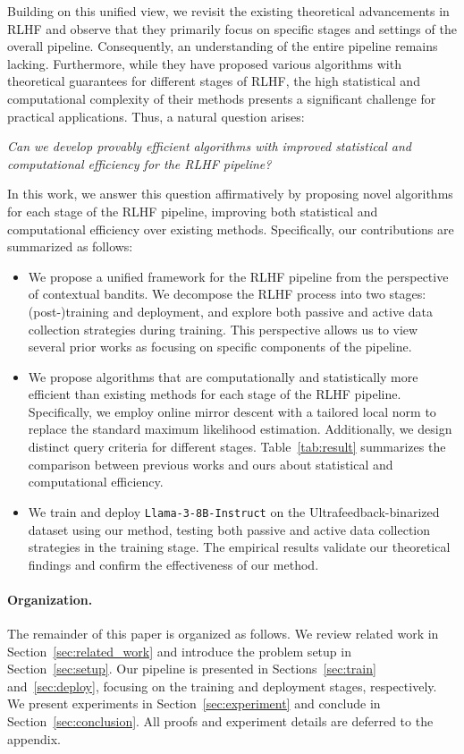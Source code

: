 Building on this unified view, we revisit the existing theoretical advancements in RLHF and observe that they primarily focus on specific stages and settings of the overall pipeline. Consequently, an understanding of the entire pipeline remains lacking. Furthermore, while they have proposed various algorithms with theoretical guarantees for different stages of RLHF, the high statistical and computational complexity of their methods presents a significant challenge for practical applications. Thus, a natural question arises:
\begin{center} 
    \textit{Can we develop provably efficient algorithms with improved statistical and computational efficiency for the RLHF pipeline?}
\end{center}
In this work, we answer this question affirmatively by proposing novel algorithms for each stage of the RLHF pipeline, improving both statistical and computational efficiency over existing methods. Specifically, our contributions are summarized as follows:
\begin{itemize}
    \item We propose a unified framework for the RLHF pipeline from the perspective of contextual bandits. We decompose the RLHF process into two stages: (post-)training and deployment, and explore both passive and active data collection strategies during training. This perspective allows us to view several prior works as focusing on specific components of the pipeline.
    \item We propose algorithms that are computationally and statistically more efficient than existing methods for each stage of the RLHF pipeline. Specifically, we employ online mirror descent with a tailored local norm to replace the standard maximum likelihood estimation. Additionally, we design distinct query criteria for different stages. Table~\ref{tab:result} summarizes the comparison between previous works and ours about statistical and computational efficiency.
    \item We train and deploy \texttt{Llama-3-8B-Instruct} on the \mbox{Ultrafeedback-binarized} dataset using our method, testing both passive and active data collection strategies in the training stage. The empirical results validate our theoretical findings and confirm the effectiveness of our method.
\end{itemize}

\paragraph{Organization.} The remainder of this paper is organized as follows. We review related work in Section~\ref{sec:related_work} and introduce the problem setup in Section~\ref{sec:setup}. Our pipeline is presented in Sections~\ref{sec:train} and~\ref{sec:deploy}, focusing on the training and deployment stages, respectively. We present experiments in Section~\ref{sec:experiment} and conclude in Section~\ref{sec:conclusion}. All proofs and experiment details are deferred to the appendix.

